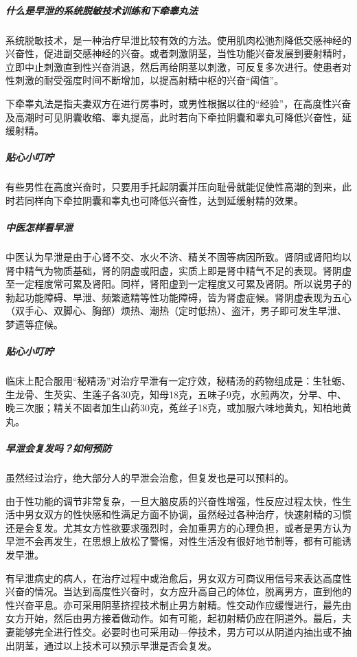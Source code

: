 \subparagraph{什么是早泄的系统脱敏技术训练和下牵睾丸法}

系统脱敏技术，是一种治疗早泄比较有效的方法。使用肌肉松弛剂降低交感神经的兴奋性，促进副交感神经的兴奋。或者刺激阴茎，当性功能兴奋发展到要射精时，立即中止刺激直到性兴奋消退，然后再给阴茎以刺激，可反复多次进行。使患者对性刺激的耐受强度时间不断增加，以提高射精中枢的兴奋“阈值”。

下牵睾丸法是指夫妻双方在进行房事时，或男性根据以往的“经验”，在高度性兴奋及高潮时可见阴囊收缩、睾丸提高，此时若向下牵拉阴囊和睾丸可降低兴奋性，延缓射精。

\subparagraph{贴心小叮咛}

有些男性在高度兴奋时，只要用手托起阴囊并压向耻骨就能促使性高潮的到来，此时若同样向下牵拉阴囊和睾丸也可降低兴奋性，达到延缓射精的效果。

\subparagraph{中医怎样看早泄}

中医认为早泄是由于心肾不交、水火不济、精关不固等病因所致。肾阴或肾阳均以肾中精气为物质基础，肾的阴虚或阳虚，实质上即是肾中精气不足的表现。肾阴虚至一定程度常可累及肾阳。同样，肾阳虚到一定程度又可累及肾阴。所以说男子的勃起功能障碍、早泄、频繁遗精等性功能障碍，皆为肾虚症候。肾阴虚表现为五心（双手心、双脚心、胸部）烦热、潮热（定时低热）、盗汗，男子即可发生早泄、梦遗等症候。

\subparagraph{贴心小叮咛}

临床上配合服用“秘精汤”对治疗早泄有一定疗效，秘精汤的药物组成是：生牡蛎、生龙骨、生芡实、生莲子各30克，知母18克，五味子9克，水煎两次，分早、中、晚三次服；精关不固者加生山药30克，菟丝子18克，或加服六味地黄丸，知柏地黄丸。

\subparagraph{早泄会复发吗？如何预防}

虽然经过治疗，绝大部分人的早泄会治愈，但复发也是可以预料的。

由于性功能的调节非常复杂，一旦大脑皮质的兴奋性增强，性反应过程太快，性生活中男女双方的性快感和性满足方面不协调，虽然经过各种治疗，快速射精的习惯还是会复发。尤其女方性欲要求强烈时，会加重男方的心理负担，或者是男方认为早泄不会再发生，在思想上放松了警惕，对性生活没有很好地节制等，都有可能诱发早泄。

有早泄病史的病人，在治疗过程中或治愈后，男女双方可商议用信号来表达高度性兴奋的情况。当达到高度性兴奋时，女方应升高自己的体位，脱离男方，直到他的性兴奋平息。亦可采用阴茎挤捏技术制止男方射精。性交动作应缓慢进行，最先由女方开始，然后由男方接着做动作。如有可能，起初射精仍应在阴道外。最后，夫妻能够完全进行性交。必要时也可采用动—停技术，男方可以从阴道内抽出或不抽出阴茎，通过以上技术可以预示早泄是否会复发。

